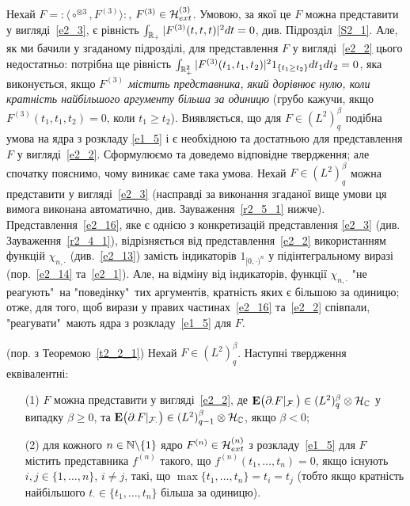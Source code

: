 Нехай $F={:\!\langle}\circ^{\otimes 3},F^{(3)}{\rangle\!:}$, $F^{(3)}\in\mathcal{H}_{ext}^{(3)}$.
Умовою, за якої це $F$ можна представити у вигляді~\eqref{e2_3}, є рівність
$\int_{\mathbb{R}_+}|F^{(3)}(t,t,t)|^2dt=0$, див. Підрозділ~\ref{S2_1}. Але, як ми бачили у
згаданому підрозділі, для представлення $F$ у вигляді~\eqref{e2_2} цього недостатньо: потрібна
ще рівність $\int_{\mathbb{R}_+^2}|F^{(3)}(t_1,t_1,t_2)|^21_{\{t_1\geq t_2\}}dt_1dt_2=0$, яка
виконується, якщо {\it $F^{(3)}$ містить представника, який дорівнює нулю, коли кратність
найбільшого аргументу більша за одиницю} (грубо кажучи, якщо $F^{(3)}(t_1,t_1,t_2)=0$, коли
$t_1\geq t_2$). Виявляється, що для $F\in (L^2)^\beta_q$ подібна умова на ядра з розкладу
\eqref{e1_5} і є необхідною та достатньою для представлення $F$ у вигляді~\eqref{e2_2}.
Сформулюємо та доведемо відповідне твердження; але спочатку пояснимо, чому виникає саме така
умова. Нехай $F\in (L^2)^\beta_q$ можна представити у вигляді~\eqref{e2_3} (насправді за
виконання згаданої вище умови ця вимога виконана автоматично, див. Зауваження~\ref{r2_5_1}
нижче). Представлення~\eqref{e2_16}, яке є однією з конкретизацій представлення
\eqref{e2_3} (див. Зауваження~\ref{r2_4_1}), відрізняється від представлення~\eqref{e2_2}
використанням функцій $\chi_{n,\cdot}$ (див.~\eqref{e2_13}) замість індикаторів
$1_{[0,\cdot)^n}$ у підінтегральному виразі (пор.~\eqref{e2_14} та~\eqref{e2_1}). Але, на відміну
від індикаторів, функції $\chi_{n,\cdot}$ "не реагують"\ на "поведінку"\ тих аргументів,
кратність яких є більшою за одиницю; отже, для того, щоб вирази у правих частинах~\eqref{e2_16}
та~\eqref{e2_2} співпали, "реагувати"\ мають ядра з розкладу~\eqref{e1_5} для $F$.
\begin{subtheorem}{\rm (пор. з Теоремою~\ref{t2_2_1})}\label{t2_5_1}
Нехай $F\in (L^2)^\beta_q$. Наступні твердження еквівалентні:
\begin{itemize}
\item[(1)] $F$ можна представити у вигляді~\eqref{e2_2}, де
$\mathbf{E}\big(\partial_\cdot F|_{\mathcal F_\cdot}\big)
\in (L^2)^\beta_q\otimes\mathcal{H}_{\mathbb{C}}$ у випадку $\beta\geq 0$, та
$\mathbf{E}\big(\partial_\cdot F|_{\mathcal F_\cdot}\big)
\in (L^2)^\beta_{q-1}\otimes\mathcal{H}_{\mathbb{C}}$, якщо $\beta<0$;
\item[(2)] для кожного $n\in\mathbb{N}\backslash\{1\}$ ядро
$F^{(n)}\in\mathcal{H}_{ext}^{(n)}$ з розкладу~\eqref{e1_5} для $F$ містить представника
$f^{(n)}$ такого, що $f^{(n)}(t_1,\dots,t_n)=0$, якщо існують $i,j\in\{1,\dots,n\}$,
$i\not=j$, такі, що $\max\{t_1,\dots,t_n\}=t_i=t_j$ (тобто якщо кратність найбільшого
$t_\cdot\in\{t_1,\dots,t_n\}$ більша за одиницю).
\end{itemize}
\end{subtheorem}
